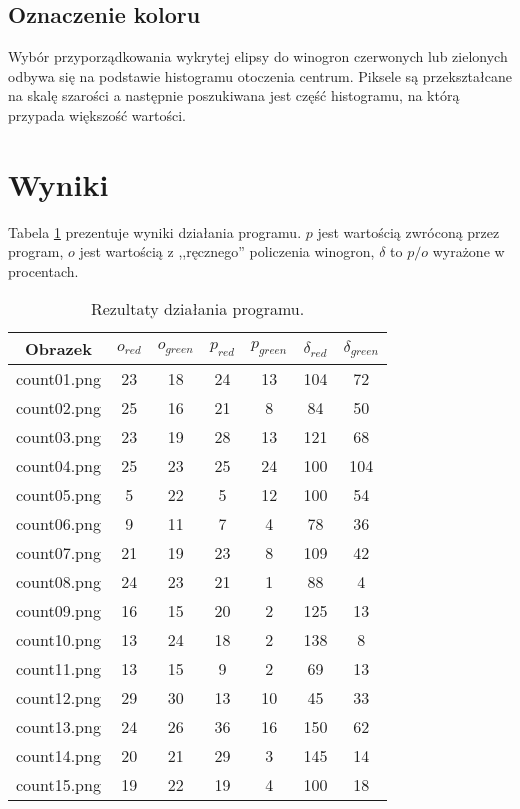 \documentclass{classrep}
\begin{document}
\subsection{Oznaczenie koloru}
Wybór przyporządkowania wykrytej elipsy do winogron czerwonych lub zielonych odbywa się na podstawie histogramu otoczenia centrum. Piksele są przekształcane na skalę szarości a następnie poszukiwana jest część histogramu, na którą przypada większość wartości.

\section{Wyniki}
Tabela \ref{tab:results} prezentuje wyniki działania programu. $p$ jest wartością zwróconą przez program, $o$ jest wartością z ,,ręcznego'' policzenia winogron, $\delta$ to $p / o$ wyrażone w procentach.

\begin{table}
\centering
\caption{Rezultaty działania programu.}
\label{tab:results}
\begin{tabular}{|c|c|c|c|c|c|c|}
\hline
Obrazek & $o_{red}$ & $o_{green}$ & $p_{red}$ & $p_{green}$ & $\delta_{red}$ & $\delta_{green}$ \\
\hline
\hline
count01.png & 23 & 18 & 24 & 13 & 104 & 72\\
\hline
count02.png & 25 & 16 & 21 & 8 & 84 & 50\\
\hline
count03.png & 23 & 19 & 28 & 13 & 121 & 68\\
\hline
count04.png & 25 & 23 & 25 & 24 & 100 & 104\\
\hline
count05.png & 5 & 22 & 5 & 12 & 100 & 54\\
\hline
count06.png & 9 & 11 & 7 & 4 & 78 & 36\\
\hline
count07.png & 21 & 19 & 23 & 8 & 109 & 42\\
\hline
count08.png & 24 & 23 & 21 & 1 & 88 & 4\\
\hline
count09.png & 16 & 15 & 20 & 2 & 125 & 13\\
\hline
count10.png & 13 & 24 & 18 & 2 & 138 & 8\\
\hline
count11.png & 13 & 15 & 9 & 2 & 69 & 13\\
\hline
count12.png & 29 & 30 & 13 & 10 & 45 & 33\\
\hline
count13.png & 24 & 26 & 36 & 16 & 150 & 62\\
\hline
count14.png & 20 & 21 & 29 & 3 & 145 & 14\\
\hline
count15.png & 19 & 22 & 19 & 4 & 100 & 18\\
\hline
\end{tabular}
\end{table}
\end{document}
